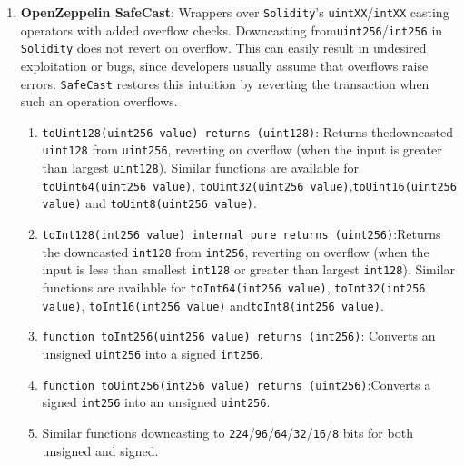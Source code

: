 \begin{enumerate}
\item\textbf{OpenZeppelin SafeCast}: Wrappers over \verb|Solidity|'s \verb|uintXX|/\verb|intXX| casting operators with added overflow checks. Downcasting from\linebreak\verb|uint256|/\verb|int256| in \verb|Solidity| does not revert on overflow. This can easily result in undesired exploitation or bugs, since developers usually assume that overflows raise errors. \verb|SafeCast| restores this intuition by reverting the transaction when such an operation overflows.
	\begin{enumerate}
	\item\verb|toUint128(uint256 value) returns (uint128)|: Returns the\linebreak downcasted \verb|uint128| from \verb|uint256|, reverting on overflow (when the input is greater than largest \verb|uint128|). Similar functions are available for \verb|toUint64(uint256 value)|, \verb|toUint32(uint256 value)|,\linebreak\verb|toUint16(uint256 value)| and \verb|toUint8(uint256 value)|.
	\item\verb|toInt128(int256 value) internal pure returns (uint256)|:\linebreak Returns the downcasted \verb|int128| from \verb|int256|, reverting on overflow (when the input is less than smallest \verb|int128| or greater than largest \verb|int128|). Similar functions are available for \verb|toInt64(int256 value)|, \verb|toInt32(int256 value)|, \verb|toInt16(int256 value)| and\linebreak\verb|toInt8(int256 value)|.
	\item\verb|function toInt256(uint256 value) returns (int256)|: Converts an unsigned \verb|uint256| into a signed \verb|int256|.
	\item\verb|function toUint256(int256 value) returns (uint256)|:\linebreak Converts a signed \verb|int256| into an unsigned \verb|uint256|.
	\item Similar functions downcasting to \verb|224|/\verb|96|/\verb|64|/\verb|32|/\verb|16|/\verb|8| bits for both unsigned and signed.
	\end{enumerate}


\end{enumerate}
